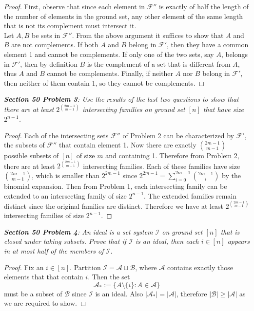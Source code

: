 \documentclass{article}
\begin{document}
  \begin{proof}
    First, observe that since each element in $\mathcal{F}''$ is exactly of
    half the length of the number of elements in the ground set, any other
    element of the same length that is not its complement must intersect
    it. \\

    Let $A,B$ be sets in $\mathcal{F}''$. From the above argument it
    suffices to show that $A$ and $B$ are not complements. If both $A$ and
    $B$ belong in $\mathcal{F}'$, then they have a common element 1 and
    cannot be complements. If only one of the two sets, say $A$,
    belongs in $\mathcal{F}'$, then by definition $B$ is the complement of
    a set that is different from $A$, thus $A$ and $B$ cannot be
    complements. Finally, if neither $A$ nor $B$ belong in $\mathcal{F}'$,
    then neither of them contain 1, so they cannot be complements.
  \end{proof}

\it \textbf{Section 50 Problem 3}: Use the results of the last two
  questions to show that there are at least $2^{\binom{2m-1}{m-1}}$
  intersecting families on ground set $[n]$ that have size $2^{n-1}$.

  \begin{proof}
    Each of the intersecting sets $\mathcal{F}''$ of Problem 2 can be
    characterized by $\mathcal{F}'$, the subsets of $\mathcal{F}''$ that
    contain element 1. Now there are exactly $\binom{2m-1}{m-1}$ possible
    subsets of $[n]$ of size $m$ and containing 1. Therefore from Problem
    2, there are at least $2^{\binom{2m-1}{m-1}}$ intersecting families.
    Each of these families have size $\binom{2m-1}{m-1}$, which is smaller
    than $2^{2m-1}$ since $2^{2m-1}=\sum_{i=0}^{2m-1} \binom{2m-1}{i}$ by
    the binomial expansion. Then from Problem 1, each intersecting family
    can be extended to an intersecting family of size $2^{n-1}$. The
    extended families remain distinct since the original families are
    distinct. Therefore we have at least $2^{\binom{2m-1}{m-1}}$
    intersecting families of size $2^{n-1}$.
  \end{proof}

\it \textbf{Section 50 Problem 4}: An ideal is a set system $\mathcal{I}$
  on ground set $[n]$ that is closed under taking subsets. Prove that if
  $\mathcal{I}$ is an ideal, then each $i\in[n]$ appears in at most half of
  the members of $\mathcal{I}$.

  \begin{proof}
    Fix an $i\in[n]$. Partition $\mathcal{I}=\mathcal{A}\sqcup
    \mathcal{B}$, where $\mathcal{A}$ contains exactly those elements that
    that contain $i$. Then the set
    \[\mathcal{A}_*:=\{A\setminus\{i\}: A\in\mathcal{A}\}\]
    must be a subset of $\mathcal{B}$ since $\mathcal{I}$ is an ideal. Also
    $|\mathcal{A}_*|=|\mathcal{A}|$, therefore
    $|\mathcal{B}|\geq|\mathcal{A}|$ as we are required to show.
  \end{proof}
\end{document}
